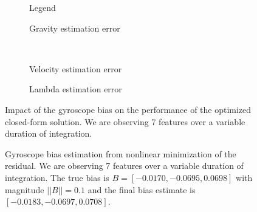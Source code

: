 \documentclass[letterpaper, 10 pt, conference]{ieeeconf}  %
\begin{document}
\begin{figure}
  \centering
        \hspace{0.2\columnwidth}%
        \begin{subfigure}[b]{0.3\columnwidth}
                \resizebox{\columnwidth}{!}{}
                \caption{Legend}

        \end{subfigure}%
        \begin{subfigure}[b]{0.5\columnwidth}
                \resizebox{\columnwidth}{!}{}
                \caption{Gravity estimation error}

        \end{subfigure}
        ~
        \begin{subfigure}[b]{0.5\columnwidth}
                \resizebox{\columnwidth}{!}{}
                \caption{Velocity estimation error}

        \end{subfigure}%
        \begin{subfigure}[b]{0.5\columnwidth}
                \resizebox{\columnwidth}{!}{}
                \caption{Lambda estimation error}

        \end{subfigure}
        \caption{Impact of the gyroscope bias on the performance of the optimized closed-form solution. We are observing 7 features  over a variable duration of integration. \label{fig:biasGyroOpt}}
\end{figure}

\begin{figure}
  \centering
  \resizebox{0.7\columnwidth}{!}{}
  \caption{Gyroscope bias estimation from nonlinear minimization of the residual.
    We are observing 7 features over a variable duration of integration.
    The true bias is $B=[-0.0170, -0.0695, 0.0698]$ with magnitude $||B||=0.1$ and the final bias estimate is $[-0.0183, -0.0697, 0.0708]$.\label{fig:gBiasEstimate}}
\end{figure}


\end{document}
